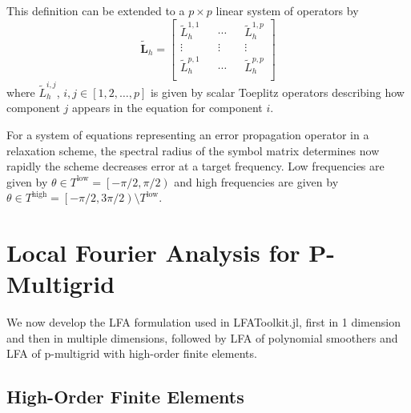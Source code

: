 \documentclass[review]{siamart190516}
\begin{document}
This definition can be extended to a $p \times p$ linear system of operators by
\begin{equation}
\tilde{\mathbf{L}}_h =
\begin{bmatrix}
    \tilde{L}_h^{1, 1} && \cdots && \tilde{L}_h^{1, p} \\
    \vdots             && \vdots && \vdots             \\
    \tilde{L}_h^{p, 1} && \cdots && \tilde{L}_h^{p, p} \\
\end{bmatrix}
\end{equation}
where $\tilde{L}_h^{i, j}$, $i, j \in \left[1, 2, \dots, p \right]$ is given by scalar Toeplitz operators describing how component $j$ appears in the equation for component $i$.

For a system of equations representing an error propagation operator in a relaxation scheme, the spectral radius of the symbol matrix determines now rapidly the scheme decreases error at a target frequency.
Low frequencies are given by $\theta \in T^{\text{low}} = \left[ - \pi / 2, \pi / 2 \right)$ and high frequencies are given by $\theta \in T^{\text{high}} = \left[ - \pi / 2, 3 \pi / 2 \right) \setminus T^{\text{low}}$. %

\section{Local Fourier Analysis for P-Multigrid}\label{sec:lfa}

We now develop the LFA formulation used in LFAToolkit.jl, first in 1 dimension and then in multiple dimensions, followed by LFA of polynomial smoothers and LFA of p-multigrid with high-order finite elements.

\subsection{High-Order Finite Elements}\label{sec:highorder}
\end{document}
